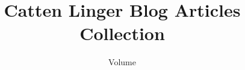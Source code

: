 \newcommand{\leftpadnumber}[1]{#1}
\newcommand{\chaptertitlefont}[0]{\rmfamily\LARGE\mdseries}



\setlength{\parskip}{0.5em}
\setlength{\parindent}{0em}

\setcounter{secnumdepth}{0}



\title{Catten Linger Blog Articles Collection}
\author{Volume \volid}

\newcommand{\leftpad}[1]{#1}


\newcommand{\iarttag}[1]{#1\hskip 0.75em}
\newcommand{\iartcat}[1]{#1\hskip 0.75em}

\newcommand{\iarticle}[4]{
    \clearpage
    \phantomsection
    \begin{minipage}{\linewidth}
        \chaptertitlefont
        \myvphantom#2\par\vskip 20pt
        \small
        \ttfamily
        \parbox{\linewidth}{\myvphantom 日期：#1}
    \end{minipage}\par
    \vskip 25pt
    \hrule
    \vskip 60pt
    \stepcounter{chapter}
    \addcontentsline{toc}{chapter}{\numberline{\arabic{chapter}}#2}
}

\newcommand{\anchorTextColor}[1]{%
    \textcolor{blue!80!green}{#1}%
}
\newcommand{\inlinehref}[2]{%
    \phantomleadingspace%
    {\anchorTextColor{%
        \href{#1}{#2}%
    }}%
    \phantomleadingspace%
    \footnote{URL: \href{#1}{#1}}%
    \phantomleadingspace%
}
\newcommand{\reflistitem}[2]{%
    \item \href{#1}{\raggedright#2\\\fontsize{8pt}{9.5pt}\ttfamily\anchorTextColor{#1}}%
}
\newcommand{\articlereflist}[1]{
    \vskip 30pt
    \vfill
    \begin{minipage}{\linewidth}
        参考资料\par
        \begin{compactitem}\small
            #1
        \end{compactitem}
    \end{minipage}
}

\newcommand{\phantomleadingspace}[0]{%
    \ifhmode%
        \hskip 7pt plus 15pt%
    \fi%
}
\newcommand{\icode}[1]{%
    \phantomleadingspace%
    \texttt{\small\textcolor{red!60!black}{#1}}%
    \hskip 5pt plus 20pt%
}

